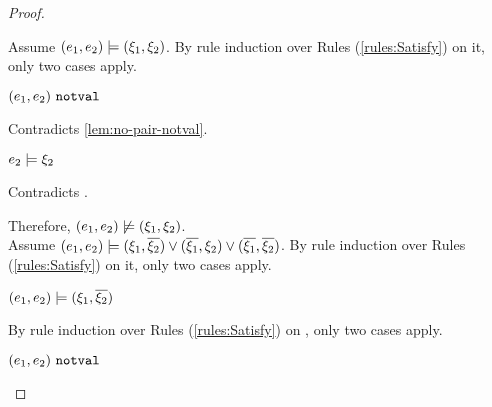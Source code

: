 \begin{proof}
\begin{byCases}
\begin{byCases}
\begin{byCases}
            Assume $(e_1 , e_2) \models (\xi_1 , \xi_2)$. By rule induction over Rules (\ref{rules:Satisfy}) on it, only two cases apply. 
           \begin{byCases}
            \item[\text{(\ref{rule:CSNotValPair})}]
                \begin{pfsteps*}
                \item $(e_1 , e_2) ~\mathtt{notval}$ 
                \end{pfsteps*}
                Contradicts \autoref{lem:no-pair-notval}.
            \item[\text{(\ref{rule:CSPair})}]
                \begin{pfsteps*}
                \item $e_2 \models \xi_2$ 
                \end{pfsteps*}
                Contradicts .
            \end{byCases}
            Therefore, $(e_1 , e_2) \not\models (\xi_1 , \xi_2)$. \\
            Assume $(e_1 , e_2) \models (\xi_1 , \overline{\xi_2}) \vee (\overline{\xi_1} , \xi_2) \vee (\overline{\xi_1} , \overline{\xi_2})$. By rule induction over Rules (\ref{rules:Satisfy}) on it, only two cases apply.
            \begin{byCases}
            \item[\text{(\ref{rule:CSOr1})}]
                \begin{pfsteps*}
                \item $(e_1 , e_2) \models (\xi_1 , \overline{\xi_2})$  
                \end{pfsteps*}
                By rule induction over Rules (\ref{rules:Satisfy}) on , only two cases apply.
                \begin{byCases}
                \item[\text{(\ref{rule:CSNotValPair})}]
                    \begin{pfsteps*}
                    \item $(e_1 , e_2) ~\mathtt{notval}$ 
                    \end{pfsteps*}

\end{byCases}
\end{byCases}
\end{byCases}
\end{byCases}
\end{byCases}
\end{proof}
